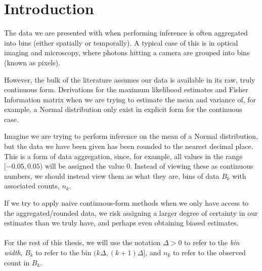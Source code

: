 \documentclass[11pt,a4,twosided,singlespacing,titlepagenumber=on,numbers=endperiod]{scrreprt}
\numberwithin{equation}{chapter} %
\theoremstyle{remark}
\begin{document}
\printunsrtglossary[type=symbols,style=long,title={Notation}]

\chapter{Introduction}

The data we are presented with when performing inference is often aggregated into bins (either spatially or temporally). A typical case of this is in optical imaging and microscopy, where photons hitting a camera are grouped into bins (known as pixels).

However, the bulk of the literature assumes our data is available in its raw, truly continuous form. Derivations for the maximum likelihood estimates and Fisher Information matrix when we are trying to estimate the mean and variance of, for example, a Normal distribution only exist in explicit form for the continuous case. 

Imagine we are trying to perform inference on the mean of a Normal distribution, but the data we have been given has been rounded to the nearest decimal place. This is a form of data aggregation, since, for example, all values in the range $[-0.05, 0.05)$ will be assigned the value $0$. Instead of viewing these as continuous numbers, we should instead view them as what they are, bins of data $B_k$ with associated counts, $n_k$.

If we try to apply naive continuous-form methods when we only have access to the aggregated/rounded data, we risk assigning a larger degree of certainty in our estimates than we truly have, and perhaps even obtaining biased estimates. \\\\
For the rest of this thesis, we will use the notation $\Delta > 0$ to refer to the \emph{bin width}, $B_k$ to refer to the bin $(k \Delta, (k+1) \Delta]$, and $n_k$ to refer to the observed count in $B_k$.
\end{document}
